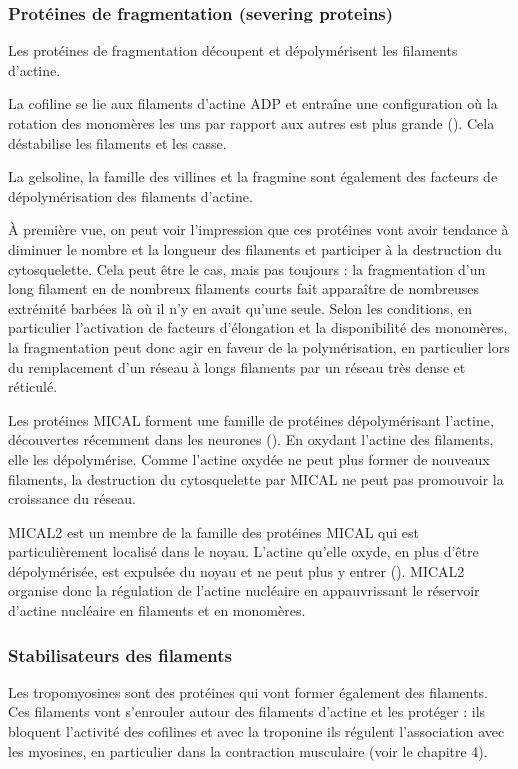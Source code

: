 \documentclass{report}
\begin{document}
\subsubsection{Protéines de fragmentation (severing proteins)}
Les protéines de fragmentation découpent et dépolymérisent les filaments d'actine. 

La cofiline se lie aux filaments d'actine ADP et entraîne une configuration où la rotation des monomères les uns par rapport aux autres est plus grande (\cite{mcgough_cofilin_1997}). Cela déstabilise les filaments et les casse. 

La gelsoline, la famille des villines et la fragmine sont également des facteurs de dépolymérisation des filaments d'actine. 

À première vue, on peut voir l'impression que ces protéines vont avoir tendance à diminuer le nombre et la longueur des filaments et participer à la destruction du cytosquelette. Cela peut être le cas, mais pas toujours : la fragmentation d'un long filament en de nombreux filaments courts fait apparaître de nombreuses extrémité barbées là où il n'y en avait qu'une seule. Selon les conditions, en particulier l'activation de facteurs d'élongation et la disponibilité des monomères, la fragmentation peut donc agir en faveur de la polymérisation, en particulier lors du remplacement d'un réseau à longs filaments par un réseau très dense et réticulé. 

Les protéines MICAL forment une famille de protéines dépolymérisant l'actine, découvertes récemment dans les neurones (\cite{hung_direct_2011}). En oxydant l'actine des filaments, elle les dépolymérise. Comme l'actine oxydée ne peut plus former de nouveaux filaments, la destruction du cytosquelette par MICAL ne peut pas promouvoir la croissance du réseau. 

MICAL2 est un membre de la famille des protéines MICAL qui est particulièrement localisé dans le noyau. L'actine qu'elle oxyde, en plus d'être dépolymérisée, est expulsée du noyau et ne peut plus y entrer (\cite{lundquist_redox_2014}). MICAL2 organise donc la régulation de l'actine nucléaire en appauvrissant le réservoir d'actine nucléaire en filaments et en monomères.

\subsubsection{Stabilisateurs des filaments}

Les tropomyosines sont des protéines qui vont former également des filaments. Ces filaments vont s'enrouler autour des filaments d'actine et les protéger : ils bloquent l'activité des cofilines et avec la troponine ils régulent l'association avec les myosines, en particulier dans la contraction musculaire (voir le chapitre 4).
\end{document}
